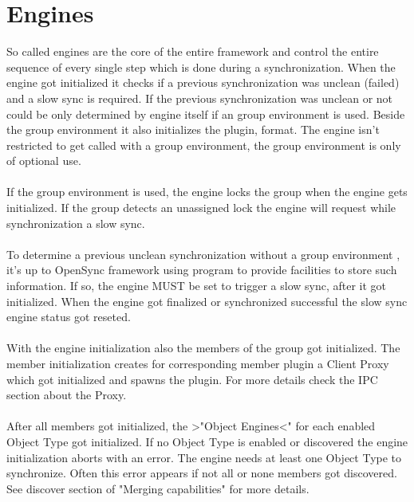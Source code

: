 \section{Engines}
So called engines are the core of the entire framework and control the entire
sequence of every single step which is done during a synchronization. When the
engine got initialized it checks if a previous synchronization was unclean
(failed) and a slow sync is required. If the previous synchronization was
unclean or not could be only determined by engine itself if an group environment
is used. Beside the group environment it also initializes the plugin, format.
The engine isn't restricted to get called with a group environment, the group 
environment is only of optional use.\\
\\
If the group environment is used, the engine locks the group when the engine
gets initialized. If the group detects an unassigned lock the engine will
request while synchronization a slow sync.\\
\\
To determine a previous unclean synchronization without a group environment , 
it's up to OpenSync framework using program to provide facilities to store such 
information. If so, the engine MUST be set to trigger a slow sync, after it got 
initialized. When the engine got finalized or synchronized successful the slow 
sync engine status got reseted.\\
\\
With the engine initialization also the members of the group got initialized.
The member initialization creates for corresponding member plugin a Client Proxy
which got initialized and spawns the plugin. For more details check the IPC
section about the Proxy.\\
\\
After all members got initialized, the >"Object Engines<" for each enabled
Object Type got initialized. If no Object Type is enabled or discovered the
engine initialization aborts with an error. The engine needs at least one Object
Type to synchronize. Often this error appears if not all or none members got
discovered. See discover section of "Merging capabilities" for more details.

